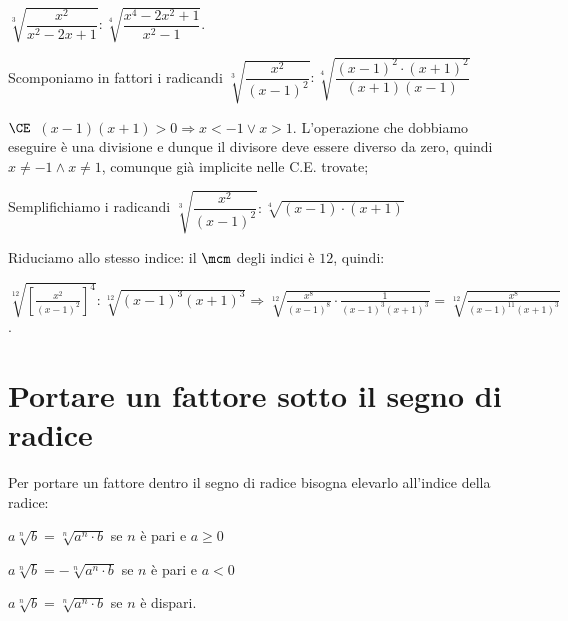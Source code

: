 \begin{exrig}
\begin{esempio}
 $\sqrt[3]{\dfrac{x^2}{x^2-2x+1}}:\sqrt[4]{\dfrac{x^4-2x^2+1}{x^2-1}}$.

 \begin{enumeratea}
\item Scomponiamo in fattori i radicandi
 $\sqrt[3]{\dfrac{x^2}{(x-1)^2}}:
 \sqrt[4]{\dfrac{(x-1)^2\cdot (x+1)^2}{(x+1)(x-1)}}$
\item $\CE$\, $(x-1)(x+1)>0\Rightarrow x<-1\vee x>1$. 
 L'operazione che dobbiamo eseguire è una divisione e dunque il divisore deve 
 essere diverso da zero, quindi $x\neq -1\wedge x\neq 1$, comunque già 
 implicite nelle C.E. trovate;
 
\begin{center}
 
\end{center}
\item Semplifichiamo i radicandi 
 $\sqrt[3]{\dfrac{x^2}{(x-1)^2}}:\sqrt[4]{(x-1)\cdot (x+1)}$
\item Riduciamo allo stesso indice: il $\mcm$ degli indici è $12$, quindi:

$\sqrt[12]{\left[\frac{x^2}{(x-1)^2}\right]^4}:\sqrt[12]{(x-1)^3 (x+1)^3}
\Rightarrow 
\sqrt[12]{\frac{x^8}{(x-1)^8}\cdot \frac 1{(x-1)^3 (x+1)^3}}=
\sqrt[12]{\frac{x^8}{(x-1)^{11}(x+1)^3}}$.
\end{enumeratea}
\end{esempio}
\end{exrig}


\section{Portare un fattore sotto il segno di radice}
\label{sec:radici_portare_dentro}

Per portare un fattore dentro il segno di radice bisogna elevarlo all'indice 
della radice:
\begin{itemize*}
 \item $a\sqrt[n]b=\sqrt[n]{a^n\cdot b}$ se $n$ è pari e $a\ge 0$
 \item $a\sqrt[n]b=-\sqrt[n]{a^n\cdot b}$ se $n$ è pari e $a<0$
 \item $a\sqrt[n]b=\sqrt[n]{a^n\cdot b}$ se $n$ è dispari.
\end{itemize*}


